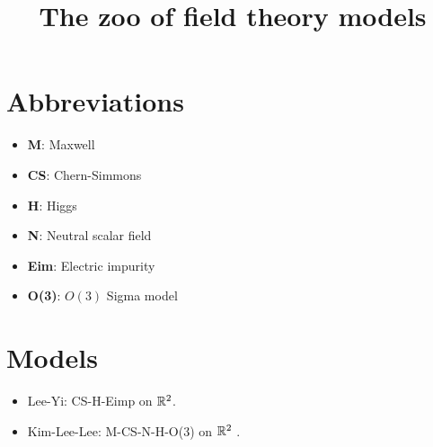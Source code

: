 \documentclass{amsart}
\begin{document}
\title{The zoo of field theory models}
\maketitle

\section{Abbreviations}

\begin{itemize}
\item \textbf{M}: Maxwell
\item \textbf{CS}: Chern-Simmons
\item \textbf{H}: Higgs
\item \textbf{N}: Neutral scalar field
\item \textbf{Eim}: Electric impurity
\item \textbf{O(3)}: $O(3)$ Sigma model
\end{itemize}

\section{Models}

\begin{itemize}
\item Lee-Yi: CS-H-Eimp on $\mathbb{R}^{2}$\cite{PhysRevD.52.2412}.
\item Kim-Lee-Lee: M-CS-N-H-O(3) on $\mathbb{R}^{2}$ \cite{PhysRevD.53.4436}.
\end{itemize}



\printbibliography
\end{document}
